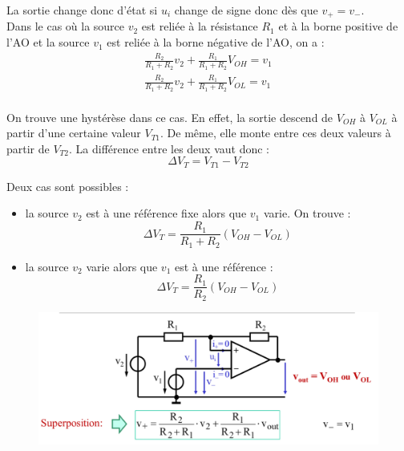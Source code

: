 \documentclass[../main.tex]{subfiles}
\begin{document}
La sortie change donc d'état si $u_i$ change de signe donc dès que $v_+ = v_-$.\\
Dans le cas où la source $v_2$ est reliée à la résistance $R_1$ et à la borne positive de l'AO et la source $v_1$ est reliée à la borne négative de l'AO, on a : \\
\begin{equation}
\begin{gathered}
    \frac{R_2}{R_1+R_2} v_2 + \frac{R_1}{R_1+R_2}V_{OH} = v_1\\
    \frac{R_2}{R_1+R_2} v_2 + \frac{R_1}{R_1+R_2}V_{OL} = v_1\\
    \end{gathered}
\end{equation}

On trouve une hystérèse dans ce cas. En effet, la sortie descend de $V_{OH}$ à $V_{OL}$ à partir d'une certaine valeur $V_{T1}$. De même, elle monte entre ces deux valeurs à partir de $V_{T2}$. La différence entre les deux vaut donc : \begin{equation}
    \Delta V_T = V_{T1}-V_{T2}
\end{equation}

Deux cas sont possibles : \begin{itemize}
    \item la source $v_2$ est à une référence fixe alors que $v_1$ varie. On trouve : \begin{equation}
         \Delta V_T= \frac{R_1}{R_1+R_2} (V_{OH}-V_{OL})
    \end{equation}
    \item la source $v_2$ varie alors que $v_1$ est à une référence : \begin{equation}
        \Delta V_T = \frac{R_1}{R_2} (V_{OH}-V_{OL})
    \end{equation}
\end{itemize}

\begin{figure}[hbt!]
    \centering
    \includegraphics[width=.8\textwidth]{IMAGES/elec/IMG_0148.jpeg}
\end{figure}
\end{document}
